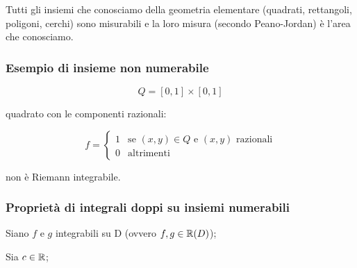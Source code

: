 Tutti gli insiemi che conosciamo della geometria elementare (quadrati, rettangoli, poligoni, cerchi) sono misurabili e la loro misura (secondo Peano-Jordan) è l'area che conosciamo.

\subsubsection*{Esempio di insieme non numerabile}

\[
    Q = [0,1] \times [0,1]
\]

quadrato con le componenti razionali:

\[
    f = \begin{cases}
        1 & \text{se \((x,y) \in Q\) e \((x,y)\) razionali} \\
        0 & \text{altrimenti}
    \end{cases}
\]

non è Riemann integrabile.

\subsubsection{Proprietà di integrali doppi su insiemi numerabili}

Siano \(f\) e \(g\) integrabili su D (ovvero \(f,g \in \mathbb{R}(D)\));

Sia \(c \in \mathbb{R} \);

